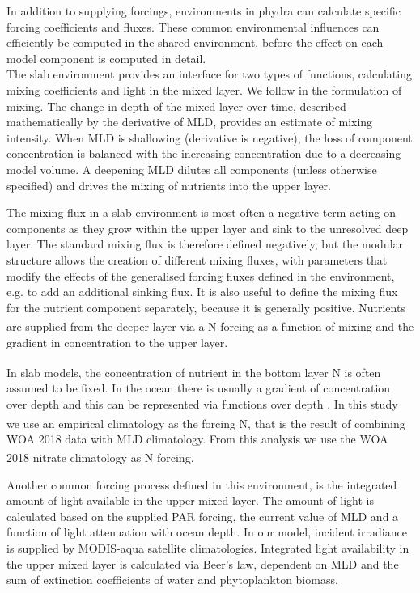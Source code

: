 \documentclass[template.tex]{subfiles}
\begin{document}
In addition to supplying forcings, environments in phydra can calculate specific forcing coefficients and fluxes. These common environmental influences can efficiently be computed in the shared environment, before the effect on each model component is computed in detail. \\

The slab environment provides an interface for two types of functions, calculating mixing coefficients and light in the mixed layer. We follow \citet{Evans1985ACycles} in the formulation of mixing. The change in depth of the mixed layer over time, described mathematically by the derivative of MLD, provides an estimate of mixing intensity. When MLD is shallowing (derivative is negative), the loss of component concentration is balanced with the increasing concentration due to a decreasing model volume. A deepening MLD dilutes all components (unless otherwise specified) and drives the mixing of nutrients into the upper layer. 

The mixing flux in a slab environment is most often a negative term acting on components as they grow within the upper layer and sink to the unresolved deep layer. The standard mixing flux is therefore defined negatively, but the modular structure allows the creation of different mixing fluxes, with parameters that modify the effects of the generalised forcing fluxes defined in the environment, e.g. to add an additional sinking flux. It is also useful to define the mixing flux for the nutrient component separately, because it is generally positive. Nutrients are supplied from the deeper layer via a \unit{N^\emptyset} forcing as a function of mixing and the gradient in concentration to the upper layer. 

In slab models, the concentration of nutrient in the bottom layer \unit{N^\emptyset} is often assumed to be fixed. In the ocean there is usually a gradient of concentration over depth and this can be represented via functions over depth \citep{Frost1987GrazingSpp., Fasham1995VariationsAnalysis}. In this study we use an empirical climatology as the forcing \unit{N^\emptyset}, that is the result of combining WOA 2018 data with MLD climatology. From this analysis we use the WOA 2018 nitrate climatology as \unit{N^\emptyset} forcing.

Another common forcing process defined in this environment, is the integrated amount of light available in the upper mixed layer. The amount of light is calculated based on the supplied PAR forcing, the current value of MLD and a function of light attenuation with ocean depth. In our model, incident irradiance is supplied by MODIS-aqua satellite climatologies. Integrated light availability in the upper mixed layer is calculated via Beer's law, dependent on MLD and the sum of extinction coefficients of water and phytoplankton biomass. 
\end{document}
